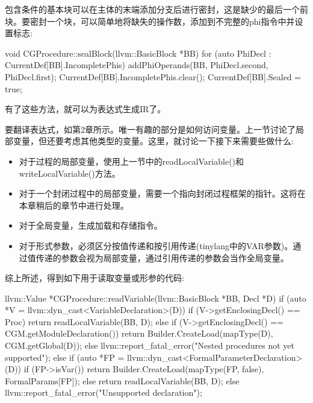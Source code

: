 包含条件的基本块可以在主体的末端添加分支后进行密封，这是缺少的最后一个前块。要密封一个块，可以简单地将缺失的操作数，添加到不完整的phi指令中并设置标志:

\begin{cpp}
void CGProcedure::sealBlock(llvm::BasicBlock *BB) {
    for (auto PhiDecl : CurrentDef[BB].IncompletePhis) {
        addPhiOperands(BB, PhiDecl.second, PhiDecl.first);
    }
    CurrentDef[BB].IncompletePhis.clear();
    CurrentDef[BB].Sealed = true;
}
\end{cpp}

有了这些方法，就可以为表达式生成IR了。


要翻译表达式，如第2章所示。唯一有趣的部分是如何访问变量。上一节讨论了局部变量，但还要考虑其他类型的变量。这里，就讨论一下接下来需要些做什么:

\begin{itemize}
\item
对于过程的局部变量，使用上一节中的readLocalVariable()和writeLocalVariable()方法。

\item
对于一个封闭过程中的局部变量，需要一个指向封闭过程框架的指针。这将在本章稍后的章节中进行处理。

\item
对于全局变量，生成加载和存储指令。

\item
对于形式参数，必须区分按值传递和按引用传递(tinylang中的VAR参数)。通过值传递的参数会视为局部变量，通过引用传递的参数会当作全局变量。
\end{itemize}

综上所述，得到如下用于读取变量或形参的代码:

\begin{cpp}
llvm::Value *CGProcedure::readVariable(llvm::BasicBlock *BB,
Decl *D) {
    if (auto *V = llvm::dyn_cast<VariableDeclaration>(D)) {
        if (V->getEnclosingDecl() == Proc)
            return readLocalVariable(BB, D);
        else if (V->getEnclosingDecl() == CGM.getModuleDeclaration()) {
            return Builder.CreateLoad(mapType(D),
            CGM.getGlobal(D));
        } else
        llvm::report_fatal_error("Nested procedures not yet supported");
    } else if (auto *FP = llvm::dyn_cast<FormalParameterDeclaration>(D)) {
        if (FP->isVar()) {
            return Builder.CreateLoad(mapType(FP, false),
            FormalParams[FP]);
        } else
        return readLocalVariable(BB, D);
    } else
        llvm::report_fatal_error("Unsupported declaration");
}
\end{cpp}

